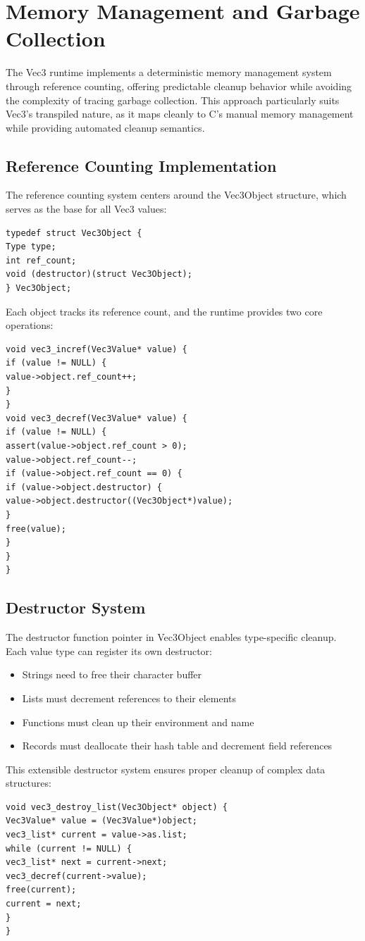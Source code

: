 \section{Memory Management and Garbage Collection}
\label{sec:memory-management}
The Vec3 runtime implements a deterministic memory management system through reference counting, offering predictable cleanup behavior while avoiding the complexity of tracing garbage collection. This approach particularly suits Vec3's transpiled nature, as it maps cleanly to C's manual memory management while providing automated cleanup semantics.
\subsection{Reference Counting Implementation}
The reference counting system centers around the Vec3Object structure, which serves as the base for all Vec3 values:
\begin{verbatim}
typedef struct Vec3Object {
Type type;
int ref_count;
void (destructor)(struct Vec3Object);
} Vec3Object;
\end{verbatim}
Each object tracks its reference count, and the runtime provides two core operations:
\begin{verbatim}
void vec3_incref(Vec3Value* value) {
if (value != NULL) {
value->object.ref_count++;
}
}
void vec3_decref(Vec3Value* value) {
if (value != NULL) {
assert(value->object.ref_count > 0);
value->object.ref_count--;
if (value->object.ref_count == 0) {
if (value->object.destructor) {
value->object.destructor((Vec3Object*)value);
}
free(value);
}
}
}
\end{verbatim}
\subsection{Destructor System}
The destructor function pointer in Vec3Object enables type-specific cleanup. Each value type can register its own destructor:
\begin{itemize}
\item Strings need to free their character buffer
\item Lists must decrement references to their elements
\item Functions must clean up their environment and name
\item Records must deallocate their hash table and decrement field references
\end{itemize}
This extensible destructor system ensures proper cleanup of complex data structures:
\begin{verbatim}
void vec3_destroy_list(Vec3Object* object) {
Vec3Value* value = (Vec3Value*)object;
vec3_list* current = value->as.list;
while (current != NULL) {
vec3_list* next = current->next;
vec3_decref(current->value);
free(current);
current = next;
}
}
\end{verbatim}
